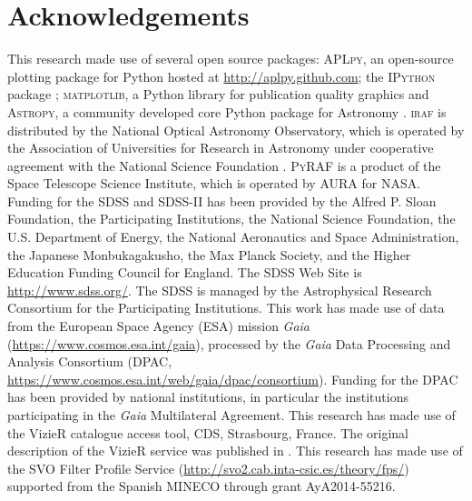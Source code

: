 \documentclass[apj, revtex4]{emulateapj}
\begin{document}
\section*{Acknowledgements} 
This research made use of several open source packages: \textsc{APLpy}, an open-source plotting package for Python hosted at \url{http://aplpy.github.com}; the \textsc{IPython} package \citep{Perez2007}; \textsc{matplotlib}, a Python library for publication quality graphics \citep{Hunter2007} and \textsc{Astropy}, a community developed core Python package for Astronomy \citep{TheAstropyCollaboration2013}.
\textsc{iraf} is distributed by the National Optical Astronomy Observatory, which is operated by the Association of Universities for Research in Astronomy under cooperative agreement with the National Science Foundation \citep{Tody1993}. 
\textsc{PyRAF} is a product of the Space Telescope Science Institute, which is operated by AURA for NASA. 
Funding for the SDSS and SDSS-II has been provided by the Alfred P. Sloan Foundation, the Participating Institutions, the National Science Foundation, the U.S. Department of Energy, the National Aeronautics and Space Administration, the Japanese Monbukagakusho, the Max Planck Society, and the Higher Education Funding Council for England. The SDSS Web Site is \url{http://www.sdss.org/}. The SDSS is managed by the Astrophysical Research Consortium for the Participating Institutions. 
This work has made use of data from the European Space Agency (ESA) mission {\it Gaia} (\url{https://www.cosmos.esa.int/gaia}), processed by the {\it Gaia} Data Processing and Analysis Consortium (DPAC, \url{https://www.cosmos.esa.int/web/gaia/dpac/consortium}). Funding for the DPAC has been provided by national institutions, in particular the institutions participating in the {\it Gaia} Multilateral Agreement.
This research has made use of the VizieR catalogue access tool, CDS, Strasbourg, France. The original description of the VizieR service was published in \cite{Ochsenbein2000}.
This research has made use of the SVO Filter Profile Service (\url{http://svo2.cab.inta-csic.es/theory/fps/}) supported from the Spanish MINECO through grant AyA2014-55216.




\end{document}
